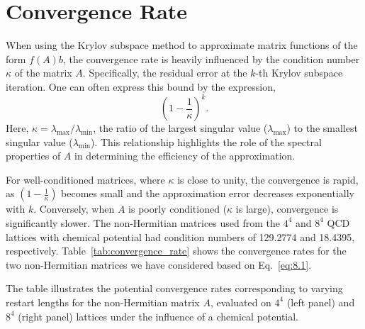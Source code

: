 \section{Convergence Rate}           
\label{sec:convergence_rate}

When using the Krylov subspace method to approximate matrix functions of the form $f(A)b$, the convergence rate is heavily influenced by the condition number $\kappa$ of the matrix $A$. Specifically, the residual error at the $k$-th Krylov subspace iteration. One can often express this bound by the expression,
\begin{equation}
    \left(1 - \frac{1}{\kappa}\right)^k.
    \label{eq:8.1}
\end{equation} 
Here, $\kappa = \lambda_{\max}/\lambda_{\min}$, the ratio of the largest singular value ($\lambda_{\max}$) to the smallest singular value ($\lambda_{\min}$). This relationship highlights the role of the spectral properties of $A$ in determining the efficiency of the approximation.

For well-conditioned matrices, where $\kappa$ is close to unity, the convergence is rapid, as $\left(1 - \frac{1}{\kappa}\right)$ becomes small and the approximation error decreases exponentially with $k$. Conversely, when $A$ is poorly conditioned ($\kappa$ is large), convergence is significantly slower. The non-Hermitian matrices used from the $4^4$ and $8^4$ QCD lattices with chemical potential had condition numbers of 129.2774 and 18.4395, respectively. Table~\ref{tab:convergence_rate} shows the convergence rates for the two non-Hermitian matrices we have considered based on Eq.~\ref{eq:8.1}.


\begin{table}[H]
    \centering
    \label{tab:convergence_rate} %
    \begin{minipage}{0.45\textwidth}
        \centering
    \end{minipage}
    \hspace{0.02\textwidth} %
    \begin{minipage}{0.45\textwidth}
        \centering
        
    \end{minipage}
    \caption{\small The table illustrates the potential convergence rates corresponding to varying restart lengths for the non-Hermitian matrix $A$, evaluated on $4^4$ (left panel) and $8^4$ (right panel) lattices under the influence of a chemical potential.}
\end{table}

